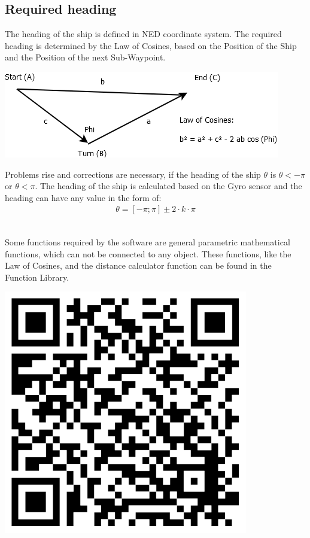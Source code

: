 \subsection{Required heading}

The heading of the ship is defined in NED coordinate system. The required heading is determined by the Law of Cosines, based on the Position of the Ship and the Position of the next Sub-Waypoint.
\begin{center}
\includegraphics[scale = 0.4]{img/Law_of_Cosines}
\end{center}
Problems rise and corrections are necessary, if the heading of the ship $\theta$ is $\theta < -\pi$ or $\theta < \pi$. The heading of the ship is calculated based on the Gyro sensor and the heading can have any value in the form of: 
\begin{align}
\theta = [-{\pi} ; \pi ] \pm 2 \cdot k \cdot \pi
\end{align}\\

\begin{tcolorbox}[colback=cyan!5,colframe=cyan!40!black,title=Code: FunctionLibrary.py \\ https://www.dropbox.com/s/7nx7helisvss21a/FunctionLibrary.py]
\begin{minipage}{0,6\textwidth}
Some functions required by the software are general parametric mathematical functions, which can not be connected to any object. These functions, like the Law of Cosines, and the distance calculator function can be found in the Function Library.
\end{minipage}
\begin{minipage}{0,35\textwidth}
\raggedleft
\includegraphics[width=0.8\textwidth]{img/functionlibrary}
\end{minipage}


\end{tcolorbox}

